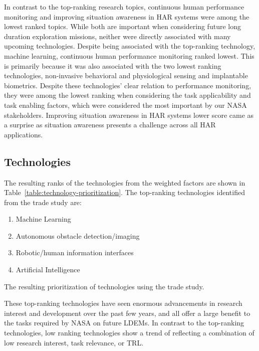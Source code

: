 In contrast to the top-ranking research topics, continuous human performance monitoring and improving situation awareness in HAR systems were among the lowest ranked topics.
While both are important when considering future long duration exploration missions, neither were directly associated with many upcoming technologies.
Despite being associated with the top-ranking technology, machine learning, continuous human performance monitoring ranked lowest.
This is primarily because it was also associated with the two lowest ranking technologies, non-invasive behavioral and physiological sensing and implantable biometrics.
Despite these technologies' clear relation to performance monitoring, they were among the lowest ranking when considering the task applicability and task enabling factors, which were considered the most important by our NASA stakeholders.
Improving situation awareness in HAR systems lower score came as a surprise as situation awareness presents a challenge across all HAR applications.

\subsection{Technologies}
The resulting ranks of the technologies from the weighted factors are shown in Table~\ref{table:technology-prioritization}.
The top-ranking technologies identified from the trade study are:
\begin{enumerate}
    \item Machine Learning
    \item Autonomous obstacle detection/imaging
    \item Robotic/human information interfaces
    \item Artificial Intelligence
\end{enumerate}

\begin{table}[tb]
    \centering
    \caption[Technology prioritization]{The resulting prioritization of technologies using the trade study.}
    \label{table:technology-prioritization}
\end{table}

These top-ranking technologies have seen enormous advancements in research interest and development over the past few years, and all offer a large benefit to the tasks required by NASA on future LDEMs.
In contrast to the top-ranking technologies, low ranking technologies show a trend of reflecting a combination of low research interest, task relevance, or TRL.

